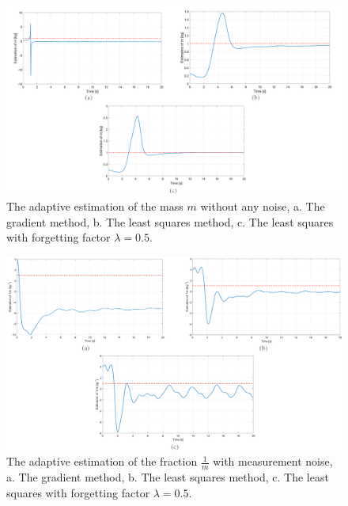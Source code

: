 \documentclass[12pt]{article}
\begin{document}
\begin{figure}[!h]
	\includegraphics[width=1\columnwidth]{figures/noiseFree_m.png}
	\centering
	\caption{The adaptive estimation of the mass $m$ without any noise, a. The gradient method, b. The least squares method, c. The least squares with forgetting factor $\lambda=0.5$.}
	\label{fig_noiseFree_m}
\end{figure}

\begin{figure}[!h]
	\includegraphics[width=.95\columnwidth]{figures/measurementNoise.png}
	\centering
	\caption{The adaptive estimation of the fraction $\frac{1}{m}$ with measurement noise, a. The gradient method, b. The least squares method, c. The least squares with forgetting factor $\lambda=0.5$.}
	\label{fig_noiseMeasurement}
\end{figure}
\end{document}
